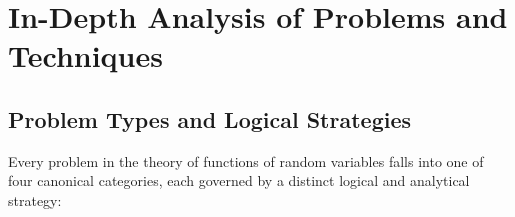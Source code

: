 \documentclass[11pt, letterpaper]{article}
\theoremstyle{definition}
\theoremstyle{remark}
\begin{document}
\newpage
\section{In-Depth Analysis of Problems and Techniques}

\subsection{Problem Types and Logical Strategies}

Every problem in the theory of functions of random variables falls into one of four canonical categories, each governed by a distinct logical and analytical strategy:
\end{document}
